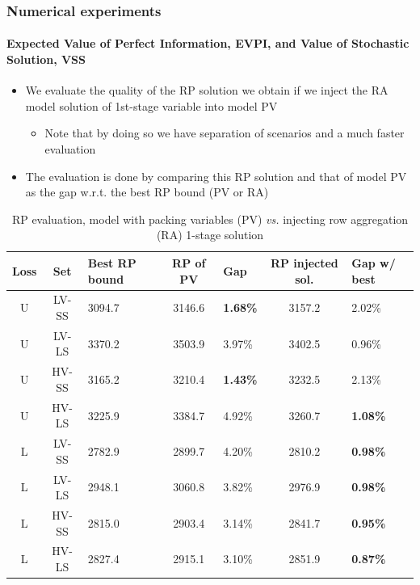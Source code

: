 \documentclass[9pt,xcolor={dvipsnames}]{beamer}
\begin{document}
\begin{frame}%
	\frametitle{Numerical experiments}
	\framesubtitle{Expected Value of Perfect Information, EVPI, and Value of Stochastic Solution, VSS}
	\begin{itemize}
		\footnotesize
		\item We evaluate the quality of the RP solution we obtain if we inject the RA model solution of 1st-stage variable into model PV
		\begin{itemize}
			\item Note that by doing so we have separation of scenarios and a much faster evaluation
		\end{itemize}
		\medskip 
		\item The evaluation is done by comparing this RP solution and that of model PV as the gap w.r.t. the best RP bound (PV or RA)
	\end{itemize}
	\begin{table}[h!]
		\centering
		\footnotesize
		\begin{tabular}{c c j c f c f}
			\hline
			Loss &
			Set & 
			Best RP bound & 
			RP of PV &
			Gap & 
			RP injected sol. & 
			Gap w/ best \\
			\hline
			U & LV-SS & 3094.7 & 3146.6 & \textbf{1.68\%} & 3157.2 & 2.02\% \\
			U & LV-LS & 3370.2 & 3503.9 & 3.97\% & 3402.5 & 0.96\% \\
			U & HV-SS & 3165.2 & 3210.4 & \textbf{1.43\%} & 3232.5 & 2.13\% \\
			U & HV-LS & 3225.9 & 3384.7 & 4.92\% & 3260.7 & \textbf{1.08\%} \\
			\hline
			L & LV-SS & 2782.9 & 2899.7 & 4.20\% & 2810.2 & \textbf{0.98\%} \\
			L & LV-LS & 2948.1 & 3060.8 & 3.82\% & 2976.9 & \textbf{0.98\%} \\
			L & HV-SS & 2815.0 & 2903.4 & 3.14\% & 2841.7 & \textbf{0.95\%} \\
			L & HV-LS & 2827.4 & 2915.1 & 3.10\% & 2851.9 & \textbf{0.87\%} \\
			\hline
		\end{tabular}
		\caption{RP evaluation, model with packing variables (PV) \textit{vs.} injecting row aggregation (RA) 1-stage solution}
		\label{tab:optres4}
	\end{table}

\end{frame}
\end{document}
